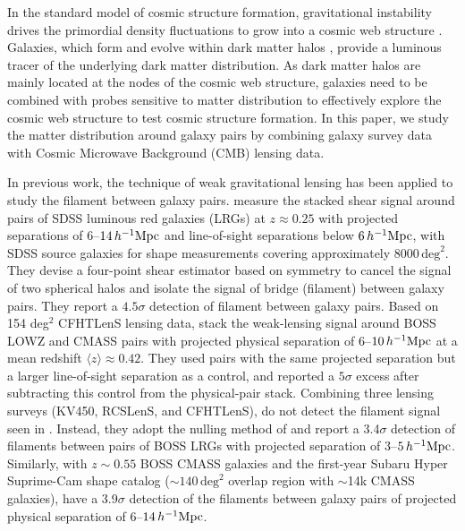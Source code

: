 \documentclass[twocolumn,anonymous,linenumbers]{aastex701}
\newcommand{\hinvMpc}{h^{-1}{\rm Mpc}}
\begin{document}
\label{sec:intro}

In the standard model of cosmic structure formation, gravitational instability drives the primordial density fluctuations to grow into a cosmic web structure \citep[e.g.,][]{Zeldovich1970, BondKofmanPogosyan1996}. Galaxies, which form and evolve within dark matter halos \citep[e.g.,][]{WhiteRees1978}, provide a luminous tracer of the underlying dark matter distribution. As dark matter halos are mainly located at the nodes of the cosmic web structure, galaxies need to be combined with probes sensitive to matter distribution to effectively explore the cosmic web structure to test cosmic structure formation. In this paper, we study the matter distribution around galaxy pairs by combining galaxy survey data with Cosmic Microwave Background (CMB) lensing data.

In previous work, the technique of weak gravitational lensing has been applied to study the filament between galaxy pairs. 
\citet{Clampitt2016} measure the stacked shear signal around pairs of SDSS luminous red galaxies (LRGs) at $z\approx0.25$ with projected separations of $6$--$14\,\hinvMpc$ and line-of-sight separations below $6\,\hinvMpc$, with SDSS source galaxies for shape measurements covering approximately $8000\,\mathrm{deg}^{2}$. 
They devise a four-point shear estimator based on symmetry to
cancel the signal of two spherical halos and isolate the signal of bridge (filament) between galaxy pairs. They report a $4.5\sigma$ detection of filament between galaxy pairs. Based on 154 deg$^2$ CFHTLenS lensing data, \citet{EppsHudson2017} stack the weak-lensing signal around BOSS LOWZ and CMASS pairs with projected physical separation of $6$--$10\,\hinvMpc$ at a mean redshift
$\langle z\rangle\approx0.42$. They used pairs with the same projected separation but a larger line-of-sight separation as a control, and reported a $5\sigma$ excess after subtracting this control from the physical-pair stack. Combining three lensing surveys (KV450, RCSLenS, and CFHTLenS), \citet{Xia2020} do not detect the filament signal seen in \citet{EppsHudson2017}. Instead, they adopt the nulling method of \citet{Clampitt2016} and report a 3.4$\sigma$ detection of filaments between pairs of BOSS LRGs with projected separation of $3$--$5\,\hinvMpc$. Similarly, with $z\sim 0.55$ BOSS CMASS galaxies and the first-year Subaru Hyper Suprime-Cam shape catalog ($\sim 140\,\mathrm{deg}^{2}$ overlap region with $\sim$14k CMASS galaxies), \citet{Kondo2020} have a 3.9$\sigma$ detection of the filaments between galaxy pairs of projected physical separation of $6$--$14\,\hinvMpc$.
\end{document}
